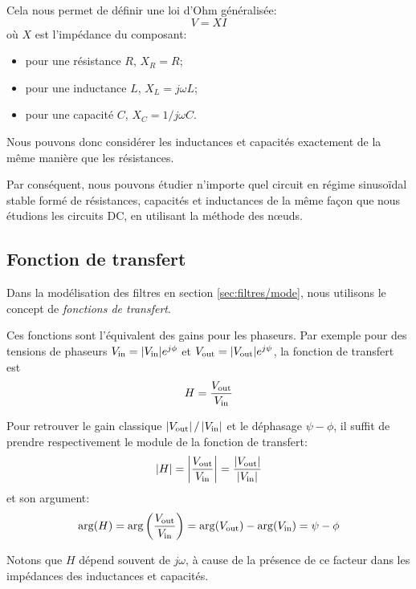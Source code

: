Cela nous permet de définir une loi d'Ohm généralisée:
\begin{equation}
    V = XI
\end{equation}
où $X$ est l'impédance du composant:
\begin{itemize}
    \item pour une résistance $R$, $X_R=R$;
    \item pour une inductance $L$, $X_L=j\omega L$;
    \item pour une capacité $C$, $X_C=1/j\omega C$.
\end{itemize}
Nous pouvons donc considérer les inductances et capacités
exactement de la même manière que les résistances.

Par conséquent, nous pouvons étudier n'importe quel circuit
en régime sinusoïdal stable formé de résistances,
capacités et inductances de la même façon que nous étudions
les circuits DC, en utilisant la méthode des nœuds.

\subsection{Fonction de transfert}

Dans la modélisation des filtres en section \ref{sec:filtres/mode},
nous utilisons le concept de \emph{fonctions de transfert}.

Ces fonctions sont l'équivalent des gains pour les phaseurs.
Par exemple pour des tensions de phaseurs
$V_{\mathrm{in}}=|V_{\mathrm{in}}|e^{j\phi}$ et $V_{\mathrm{out}}=|V_{\mathrm{out}}|e^{j\psi}$,
la fonction de transfert est
\begin{equation}
    H = \frac{V_{\mathrm{out}}}{V_{\mathrm{in}}}
\end{equation}

Pour retrouver le gain classique $|V_{\mathrm{out}}|\,/\,|V_{\mathrm{in}}|$
et le déphasage $\psi-\phi$,
il suffit de prendre respectivement le module de la fonction de transfert:
\begin{equation}
    |H| = \left|\frac{V_{\mathrm{out}}}{V_{\mathrm{in}}}\right|
    = \frac{|V_{\mathrm{out}}|}{|V_{\mathrm{in}}|}
\end{equation}
et son argument:
\begin{equation}
    \arg(H) = \arg\left(\frac{V_{\mathrm{out}}}{V_{\mathrm{in}}}\right)
    = \arg(V_{\mathrm{out}}) - \arg(V_{\mathrm{in}})
    = \psi-\phi
\end{equation}

Notons que $H$ dépend souvent de $j\omega$, à cause de la présence
de ce facteur dans les impédances des inductances et capacités.
